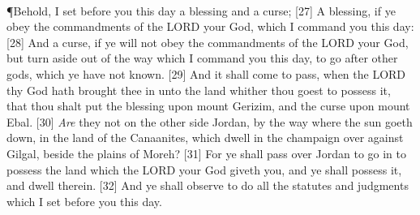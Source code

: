 \\
\P \textcolor[rgb]{0.00,0.00,1.00}{Behold, I set before you this day a blessing and a curse;}
[27] \textcolor[rgb]{0.00,0.00,1.00}{A blessing, if ye obey the commandments of the LORD your God, which I command you this day:}
[28] \textcolor[rgb]{0.00,0.00,1.00}{And a curse, if ye will not obey the commandments of the LORD your God, but turn aside out of the way which I command you this day, to go after other gods, which ye have not known.}
[29] \textcolor[rgb]{0.00,0.00,1.00}{And it shall come to pass, when the LORD thy God hath brought thee in unto the land whither thou goest to possess it, that thou shalt put the blessing upon mount Gerizim, and the curse upon mount Ebal.}
[30] \textcolor[rgb]{0.00,0.00,1.00}{\emph{Are} they not on the other side Jordan, by the way where the sun goeth down, in the land of the Canaanites, which dwell in the champaign over against Gilgal, beside the plains of Moreh?}
[31] \textcolor[rgb]{0.00,0.00,1.00}{For ye shall pass over Jordan to go in to possess the land which the LORD your God giveth you, and ye shall possess it, and dwell therein.}
[32] \textcolor[rgb]{0.00,0.00,1.00}{And ye shall observe to do all the statutes and judgments which I set before you this day.}
\newpage
